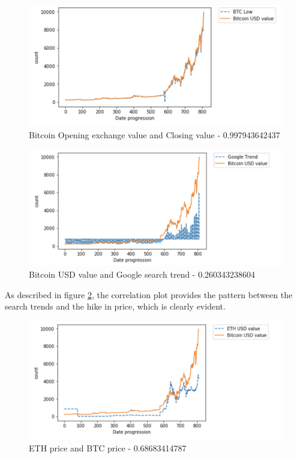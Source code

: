 \documentclass[sigconf]{acmart}
\begin{document}
\begin{figure}[!ht]
  \centering\includegraphics[width=\columnwidth]{images/low.png}
  \caption{Bitcoin Opening exchange value and Closing value - 0.997943642437}
  \label{4}
\end{figure}


\begin{figure}[!ht]
  \centering\includegraphics[width=\columnwidth]{images/googletrend.png}
  \caption{Bitcoin USD value and Google search trend - 0.260343238604}
  \label{5}
\end{figure}

As described in figure \ref{5}, the correlation plot provides the pattern between the search trends and the hike in price, which is clearly evident.

\begin{figure}[!ht]
  \centering\includegraphics[width=\columnwidth]{images/ethvalue.png}
  \caption{ETH price and BTC price - 0.68683414787 }
  \label{6}
\end{figure}
\end{document}
